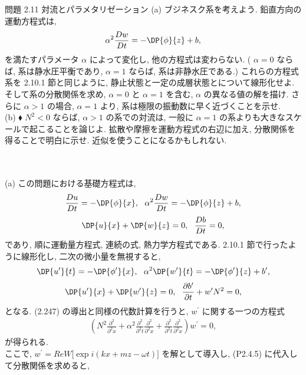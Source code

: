 \documentclass[a4j,12pt,openbib,oneside,dvipdfmx]{jreport}
\begin{document}
\begin{itembox}[l]{問題 2.11 対流とパラメタリゼーション}
(a) ブジネスク系を考えよう. 鉛直方向の運動方程式は, 
\begin{eqnarray}
  {\alpha}^2{\frac{Dw}{Dt}}=-\DP{\phi}{z}+b,
\end{eqnarray}
を満たすパラメータ $\alpha$ によって変化し, 他の方程式は変わらない. ( ${\alpha}=0$ ならば, 系は静水圧平衡であり, ${\alpha}=1$ ならば, 系は非静水圧である.) これらの方程式系を 2.10.1 節と同じように, 静止状態と一定の成層状態とについて線形化せよ. そして系の分散関係を求め, ${\alpha}=0$ と ${\alpha}=1$ を含む, $\alpha$ の異なる値の解を描け. さらに ${\alpha}>1$ の場合, ${\alpha}=1$ より, 系は極限の振動数に早く近づくことを示せ. \\
(b) ${\blacklozenge}$ $N^2<0$ ならば, ${\alpha}>1$ の系での対流は, 一般に ${\alpha}=1$ の系よりも大きなスケールで起こることを論じよ. 拡散や摩擦を運動方程式の右辺に加え, 分散関係を得ることで明白に示せ. 近似を使うことになるかもしれない. 
\end{itembox}
\\
\\
(a) この問題における基礎方程式は,
\begin{eqnarray}
  {\frac{Du}{Dt}}=-\DP{\phi}{x}, \ \ 
  {\alpha}^2{\frac{Dw}{Dt}}=-\DP{\phi}{z}+b,
\end{eqnarray}
\begin{eqnarray}
  \DP{u}{x}+\DP{w}{z}=0, \ \ 
  {\frac{Db}{Dt}}=0,
\end{eqnarray}
であり, 順に運動量方程式, 連続の式, 熱力学方程式である. 2.10.1 節で行ったように線形化し, 二次の微小量を無視すると, 
\begin{eqnarray}
  {\DP{u^{\prime}}{t}}=-\DP{\phi^{\prime}}{x}, \ \ 
  {\alpha}^2{\DP{w^{\prime}}{t}}=-\DP{\phi^{\prime}}{z}+b^{\prime},
\end{eqnarray}
\begin{eqnarray}
  \DP{u^{\prime}}{x}+\DP{w^{\prime}}{z}=0, \ \ 
  \frac{\partial b^{\prime}}{\partial t}+w^{\prime}N^2=0,
\end{eqnarray}
となる. (2.247) の導出と同様の代数計算を行うと, $w^{\prime}$ に関する一つの方程式
\begin{eqnarray}
  \left(N^2{\frac{\partial^2}{\partial^2 x}}+{\alpha}^2{\frac{\partial^2}{\partial^2 t}}{\frac{\partial^2}{\partial^2 x}}+{\frac{\partial^2}{\partial^2 t}}{\frac{\partial^2}{\partial^2 x}}\right)w^{\prime}=0,
\end{eqnarray}
が得られる.\\
ここで, $w^{\prime}=ReW[\exp{i(kx+mz-{\omega}t)]}$ を解として導入し, (P2.4.5) に代入して分散関係を求めると, 
\end{document}
